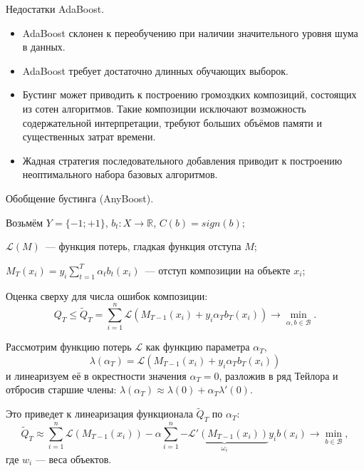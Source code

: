 \documentclass[10pt,unicode,notheorems]{beamer}
\newcommand{\Laplace}{\mathscr{L}}
\begin{document}
\begin{frame}{Недостатки AdaBoost.}
\begin{itemize}
\item AdaBoost склонен к переобучению при наличии значительного уровня шума
в данных. 
\item AdaBoost требует достаточно длинных обучающих выборок. 
\item Бустинг может приводить к построению громоздких композиций, состоящих
из сотен алгоритмов. Такие композиции исключают возможность содержательной интерпретации, требуют больших объёмов памяти и существенных затрат времени.
\item Жадная стратегия последовательного добавления приводит к построению
неоптимального набора базовых алгоритмов.

\end{itemize}
\end{frame}

\begin{frame}{Обобщение бустинга (AnyBoost).}

Возьмём $Y = \{-1;+1\}$, $b_t: X \to \mathbb{R}$, $C(b) = sign(b)$;

$\Laplace (M)$~--- функция потерь, гладкая функция отступа $M$;
\vspace{0.2cm}

$M_T(x_i) = y_i \sum_{t=1}^{T} \alpha_t b_t(x_i)$~--- отступ композиции на объекте $x_i$;
\vspace{0.2cm}

Оценка сверху для числа ошибок композиции:
$$Q_T \leq \widetilde {Q}_T =\sum_{i=1}^{n} \Laplace (M_{T-1}(x_i) + y_i \alpha_T b_T(x_i)) \to \min \limits_{\alpha, b \in \mathcal{B}}.$$

Рассмотрим функцию потерь $\Laplace$ как функцию параметра $\alpha_T$,
$$\lambda(\alpha_T) = \Laplace(M_{T-1}(x_i) + y_i \alpha_T b_T(x_i))$$
и линеаризуем её в окрестности значения  $\alpha_T = 0$, разложив в ряд Тейлора и отбросив старшие члены: $\lambda(\alpha_T) \approx \lambda(0) + \alpha_T \lambda'(0)$.

Это приведет к линеаризация функционала $\widetilde {Q}_T$ по $\alpha_T$:
$$\widetilde {Q}_T \approx \sum_{i=1}^{n} \Laplace (M_{T-1}(x_i)) - \alpha \sum_{i=1}^{n} \underbrace{ - \Laplace' (M_{T-1}(x_i))}_{\omega_i} y_i b(x_i) \to \min \limits_{b \in \mathcal{B}},$$
где $w_i$ — веса объектов.
\end{frame}
\end{document}
